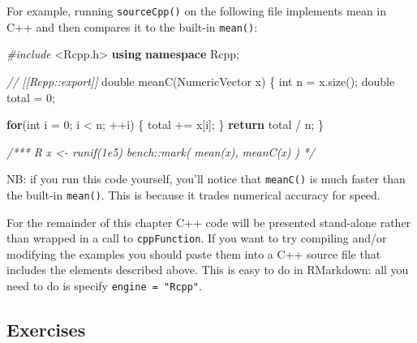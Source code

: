 \documentclass[]{book}
\newenvironment{Shaded}{\begin{snugshade}}{\end{snugshade}}
\newcommand{\CommentTok}[1]{\textcolor[rgb]{0.37,0.37,0.37}{\textit{#1}}}
\newcommand{\ControlFlowTok}[1]{\textcolor[rgb]{0.27,0.27,0.27}{\textbf{#1}}}
\newcommand{\DataTypeTok}[1]{\textcolor[rgb]{0.27,0.27,0.27}{#1}}
\newcommand{\DecValTok}[1]{\textcolor[rgb]{0.06,0.06,0.06}{#1}}
\newcommand{\ImportTok}[1]{#1}
\newcommand{\KeywordTok}[1]{\textcolor[rgb]{0.27,0.27,0.27}{\textbf{#1}}}
\newcommand{\NormalTok}[1]{#1}
\newcommand{\PreprocessorTok}[1]{\textcolor[rgb]{0.37,0.37,0.37}{\textit{#1}}}
\begin{document}
For example, running \texttt{sourceCpp()} on the following file implements mean in C++ and then compares it to the built-in \texttt{mean()}:

\begin{Shaded}
\begin{Highlighting}[]
\PreprocessorTok{#include }\ImportTok{<Rcpp.h>}
\KeywordTok{using} \KeywordTok{namespace}\NormalTok{ Rcpp;}

\CommentTok{// [[Rcpp::export]]}
\DataTypeTok{double}\NormalTok{ meanC(NumericVector x) \{}
  \DataTypeTok{int}\NormalTok{ n = x.size();}
  \DataTypeTok{double}\NormalTok{ total = }\DecValTok{0}\NormalTok{;}

  \ControlFlowTok{for}\NormalTok{(}\DataTypeTok{int}\NormalTok{ i = }\DecValTok{0}\NormalTok{; i < n; ++i) \{}
\NormalTok{    total += x[i];}
\NormalTok{  \}}
  \ControlFlowTok{return}\NormalTok{ total / n;}
\NormalTok{\}}

\CommentTok{/*** R}
\CommentTok{x <- runif(1e5)}
\CommentTok{bench::mark(}
\CommentTok{  mean(x),}
\CommentTok{  meanC(x)}
\CommentTok{)}
\CommentTok{*/}
\end{Highlighting}
\end{Shaded}

NB: if you run this code yourself, you'll notice that \texttt{meanC()} is much faster than the built-in \texttt{mean()}. This is because it trades numerical accuracy for speed.

For the remainder of this chapter C++ code will be presented stand-alone rather than wrapped in a call to \texttt{cppFunction}. If you want to try compiling and/or modifying the examples you should paste them into a C++ source file that includes the elements described above. This is easy to do in RMarkdown: all you need to do is specify \texttt{engine\ =\ "Rcpp"}.

\hypertarget{exercises-21}{%
\subsection{Exercises}\label{exercises-21}}
\end{document}
